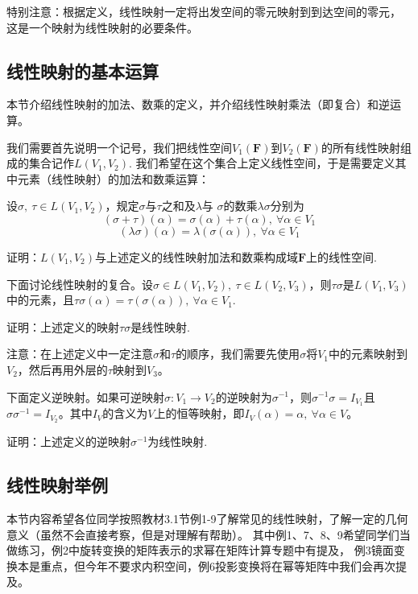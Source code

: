 特别注意：根据定义，线性映射一定将出发空间的零元映射到到达空间的零元，
这是一个映射为线性映射的必要条件。
\subsection{线性映射的基本运算}
本节介绍线性映射的加法、数乘的定义，并介绍线性映射乘法（即复合）和逆运算。

我们需要首先说明一个记号，我们把线性空间$V_1(\mathbf{F})$到$V_2(\mathbf{F})$的所有线性映射组成的集合记作$L(V_1,V_2)$.
我们希望在这个集合上定义线性空间，于是需要定义其中元素（线性映射）的加法和数乘运算：
\begin{definition}
	设$\sigma,\ \tau\in L(V_1,V_2)$，规定$\sigma$与$\tau$之和及$\lambda$与
	$\sigma$的数乘$\lambda\sigma$分别为
	\begin{equation}
		(\sigma+\tau)(\alpha)=\sigma(\alpha)+\tau(\alpha),\ \forall\alpha\in V_1
	\end{equation}
	\begin{equation}
		(\lambda\sigma)(\alpha)=\lambda(\sigma(\alpha)),\ \forall\alpha\in V_1
	\end{equation}
\end{definition}
\begin{example}
	证明：$L(V_1,V_2)$与上述定义的线性映射加法和数乘构成域$\mathbf{F}$上的线性空间.
\end{example}
下面讨论线性映射的复合。设$\sigma \in L(V_1,V_2),\ \tau \in L(V_2,V_3)$，则$\tau\sigma$是$L(V_1,V_3)$
中的元素，且$\tau\sigma(\alpha)=\tau(\sigma(\alpha)),\ \forall \alpha \in V_1$.
\begin{example}
	证明：上述定义的映射$\tau\sigma$是线性映射.
\end{example}
注意：在上述定义中一定注意$\sigma$和$\tau$的顺序，我们需要先使用$\sigma$将$V_1$中的元素映射到
$V_2$，然后再用外层的$\tau$映射到$V_3$。

下面定义逆映射。如果可逆映射$\sigma:V_1 \to V_2$的逆映射为$\sigma^{-1}$，则$\sigma^{-1}\sigma=I_{V_1}$且
$\sigma\sigma^{-1}=I_{V_2}$。其中$I_{V}$的含义为$V$上的恒等映射，即$I_V(\alpha)=\alpha,\ \forall \alpha \in V$。
\begin{example}
	证明：上述定义的逆映射$\sigma^{-1}$为线性映射.
\end{example}
\subsection{线性映射举例}
本节内容希望各位同学按照教材3.1节例1-9了解常见的线性映射，了解一定的几何意义（虽然不会直接考察，但是对理解有帮助）。
其中例1、7、8、9希望同学们当做练习，例2中旋转变换的矩阵表示的求幂在矩阵计算专题中有提及，
例3镜面变换本是重点，但今年不要求内积空间，例6投影变换将在幂等矩阵中我们会再次提及。
